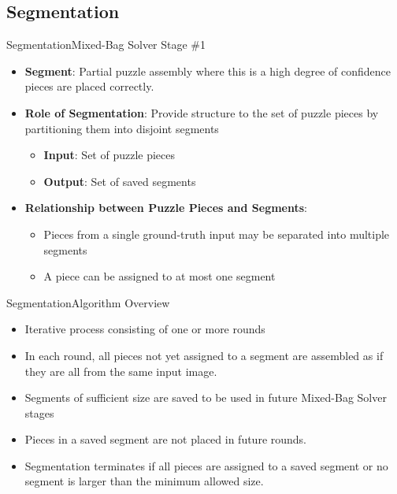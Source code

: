 \documentclass[10pt]{beamer}
\begin{document}
\subsection{Segmentation}
\begin{frame}{Segmentation}{Mixed-Bag Solver Stage \#1}
  \begin{itemize}
    \item \textbf{Segment}: Partial puzzle assembly where this is a high degree of confidence pieces are placed correctly.
    \vfill
    \item \textbf{Role of Segmentation}: Provide structure to the set of puzzle pieces by partitioning them into disjoint segments
    \begin{itemize}
      \vspace{0.4em}
      	\item \textbf{Input}: Set of puzzle pieces
  		  \vspace{0.6em}
      \item \textbf{Output}: Set of saved segments
    \end{itemize}
	  \vfill
	  \item \textbf{Relationship between Puzzle Pieces and Segments}:
	  \vspace{0.4em}
	  \begin{itemize}
      \item Pieces from a single ground-truth input may be separated into multiple segments
  	  \vspace{0.6em}   
      \item A piece can be assigned to at most one segment   
    \end{itemize}
  \end{itemize}
\end{frame}



\begin{frame}{Segmentation}{Algorithm Overview}
  \begin{itemize}
    \item Iterative process consisting of one or more rounds  
    \vfill
    \item In each round, all pieces not yet assigned to a segment are assembled as if they are all from the same input image.
    \vfill
    \item Segments of sufficient size are saved to be used in future Mixed-Bag Solver stages
    \vfill
    \item Pieces in a saved segment are not placed in future rounds.
    \vfill
    \item Segmentation terminates if all pieces are assigned to a saved segment or no segment is larger than the minimum allowed size.
    \vfill
  \end{itemize}
\end{frame}
\end{document}
